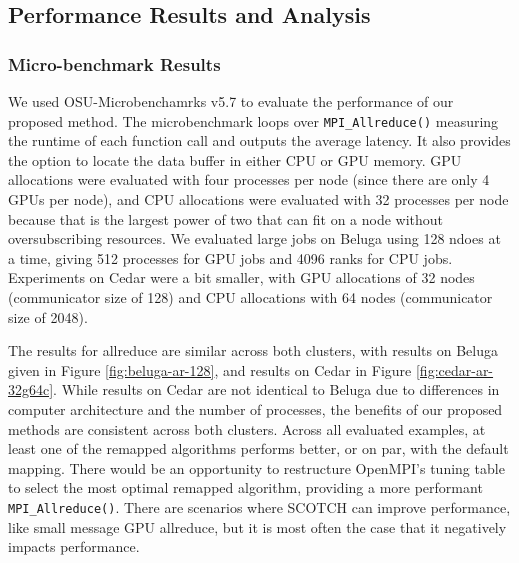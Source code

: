 \subsection{Performance Results and Analysis}

\subsubsection{Micro-benchmark Results}

We used OSU-Microbenchamrks v5.7 \cite{Bureddy2012OMB} to evaluate the performance of our proposed method. 
The microbenchmark loops over \texttt{MPI\_Allreduce()} measuring the runtime of each function call and outputs the average latency. 
It also provides the option to locate the data buffer in either \gls{CPU} or \gls{GPU} memory.
GPU allocations were evaluated with four processes per node (since there are only 4 \gls{GPU}s per node), and \gls{CPU} allocations were evaluated with 32 processes per node because that is the largest power of two that can fit on a node without oversubscribing resources.
We evaluated large jobs on Beluga using 128 ndoes at a time, giving 512 processes for \gls{GPU} jobs and 4096 ranks for \gls{CPU} jobs.
Experiments on Cedar were a bit smaller, with \gls{GPU} allocations of 32 nodes (communicator size of 128) and \gls{CPU} allocations with 64 nodes (communicator size of 2048).






The results for allreduce are similar across both clusters, with results on Beluga given in Figure \ref{fig:beluga-ar-128}, and results on Cedar in Figure \ref{fig:cedar-ar-32g64c}.
While results on Cedar are not identical to Beluga due to differences in computer architecture and the number of processes, the benefits of our proposed methods are consistent across both clusters.
Across all evaluated examples, at least one of the remapped algorithms performs better, or on par, with the default mapping. 
There would be an opportunity to restructure OpenMPI's tuning table to select the most optimal remapped algorithm, providing a more performant \texttt{MPI\_Allreduce()}.
There are scenarios where SCOTCH can improve performance, like small message \gls{GPU} allreduce, but it is most often the case that it negatively impacts performance.

